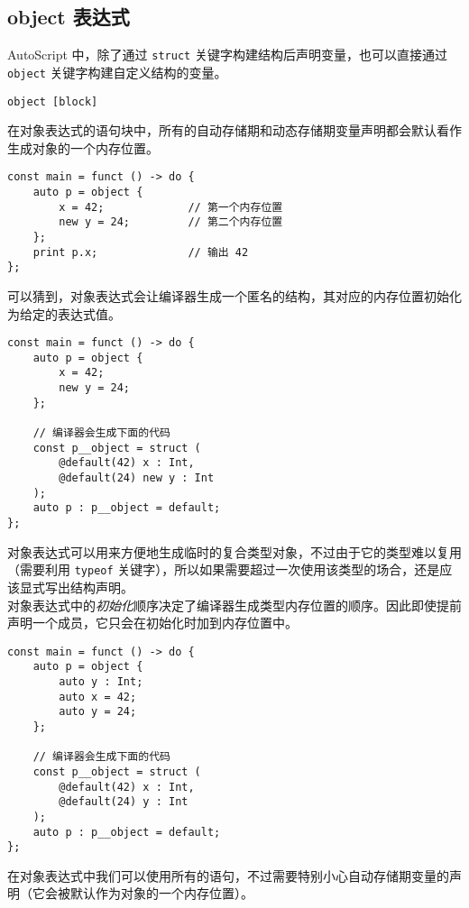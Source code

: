 \subsection{object 表达式}

AutoScript 中，除了通过 \lstinline!struct! 关键字构建结构后声明变量，也可以直接通过 \lstinline!object! 关键字构建自定义结构的变量。

\begin{grammar}[对象表达式] \label{grm:object-expression}
	\lstinline!object [block]!
\end{grammar}

在对象表达式的语句块中，所有的自动存储期和动态存储期变量声明都会默认看作生成对象的一个内存位置。

\begin{lstlisting}
const main = funct () -> do {
	auto p = object {
		x = 42;				// 第一个内存位置
		new y = 24;			// 第二个内存位置
	};
	print p.x;				// 输出 42
};
\end{lstlisting}

可以猜到，对象表达式会让编译器生成一个匿名的结构，其对应的内存位置初始化为给定的表达式值。

\begin{lstlisting}
const main = funct () -> do {
	auto p = object {
		x = 42;
		new y = 24;
	};
	
	// 编译器会生成下面的代码
	const p__object = struct (
		@default(42) x : Int,
		@default(24) new y : Int
	);
	auto p : p__object = default;
};
\end{lstlisting}

对象表达式可以用来方便地生成临时的复合类型对象，不过由于它的类型难以复用（需要利用 \lstinline!typeof! 关键字），所以如果需要超过一次使用该类型的场合，还是应该显式写出结构声明。 \\

对象表达式中的\emph{初始化}顺序决定了编译器生成类型内存位置的顺序。因此即使提前声明一个成员，它只会在初始化时加到内存位置中。

\begin{lstlisting}
const main = funct () -> do {
    auto p = object {
        auto y : Int;
        auto x = 42;
        auto y = 24;
    };
    
    // 编译器会生成下面的代码
    const p__object = struct (
        @default(42) x : Int,
        @default(24) y : Int
    );
    auto p : p__object = default;
};
\end{lstlisting}

在对象表达式中我们可以使用所有的语句，不过需要特别小心自动存储期变量的声明（它会被默认作为对象的一个内存位置）。

